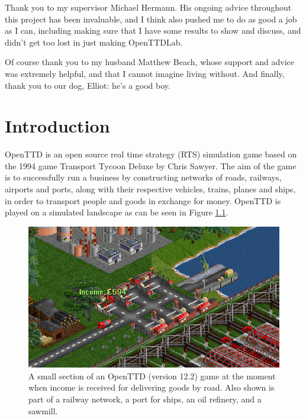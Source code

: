 \documentclass[logo,msc,dsti]{infthesis}    %
\begin{document}
\begin{preliminary}
\begin{acknowledgements}
Thank you to my supervisor Michael Hermann. His ongoing advice throughout this project has been invaluable, and I think also pushed me to do as good a job as I can, including making sure that I have some results to show and discuss, and didn't get too lost in just making OpenTTDLab.

Of course thank you to my husband Matthew Beach, whose support and advice was extremely helpful, and that I cannot imagine living without. And finally, thank you to our dog, Elliot: he's a good boy.

\end{acknowledgements}


\tableofcontents
\end{preliminary}


\chapter{Introduction}

OpenTTD \cite{openttd} is an open source real time strategy (RTS) simulation game based on the 1994 game Transport Tycoon Deluxe by Chris Sawyer. The aim of the game is to successfully run a business by constructing networks of roads, railways, airports and ports, along with their respective vehicles, trains, planes and ships, in order to transport people and goods in exchange for money. OpenTTD is played on a simulated landscape as can be seen in Figure \ref{fig:openttd}.

\begin{figure}[h]
\centering
\includegraphics[width=\columnwidth]{assets/openttd-screenshot.png}
\caption{A small section of an OpenTTD (version 12.2) game at the moment when income is received for delivering goods by road. Also shown is part of a railway network, a port for ships, an oil refinery, and a sawmill.}
\label{fig:openttd}
\end{figure}
\end{document}
